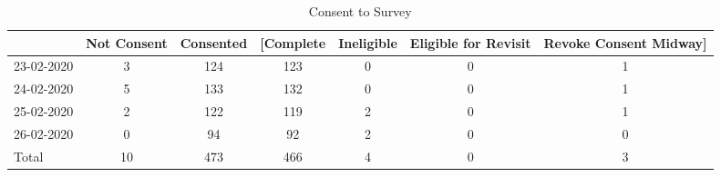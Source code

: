 \begin{table}[htbp]\centering
\caption{Consent to Survey\label{tab1-consent}}
\begin{tabular}{l*{6}{c}}
\toprule
                    & Not Consent&   Consented&   [Complete&  Ineligible&Eligible for Revisit&Revoke Consent Midway]\\
\midrule
23-02-2020          &           3&         124&         123&           0&           0&           1\\
24-02-2020          &           5&         133&         132&           0&           0&           1\\
25-02-2020          &           2&         122&         119&           2&           0&           1\\
26-02-2020          &           0&          94&          92&           2&           0&           0\\
Total               &          10&         473&         466&           4&           0&           3\\
\bottomrule
\end{tabular}
\end{table}
